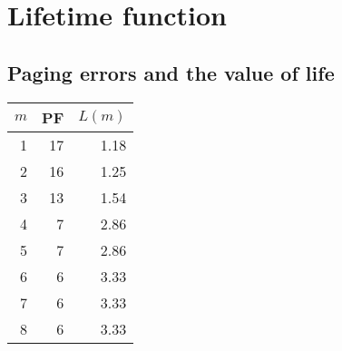 \documentclass[a4paper, 11pt]{article}
\begin{document}
      \section{Lifetime function}
      \subsection{Paging errors and the value of life}
      \begin{center}
      \begin{tabular}{|r||r|r|}
            \hline
            $m$ & PF & $L(m)$\\\hline\hline
            1 & 17 & 1.18\\\hline
            2 & 16 & 1.25\\\hline
            3 & 13 & 1.54\\\hline
            4 & 7  & 2.86\\\hline
            5 & 7  & 2.86\\\hline
            6 & 6  & 3.33\\\hline
            7 & 6  & 3.33\\\hline
            8 & 6  & 3.33\\\hline
      \end{tabular}
      \end{center}
            
\end{document}
